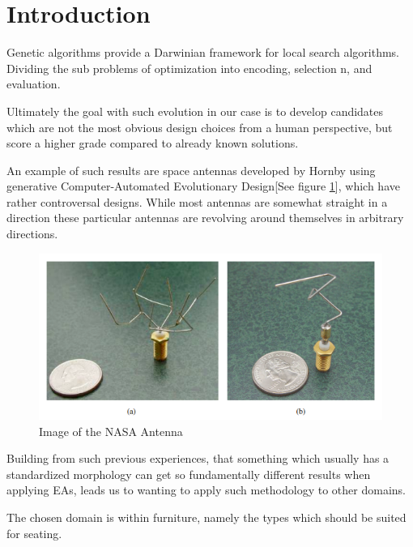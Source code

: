 \section{Introduction}
Genetic algorithms provide a Darwinian framework for local search algorithms.
Dividing the sub problems of optimization into encoding, selection
n, and evaluation\cite{paper:ev3}.

Ultimately the goal with such evolution in our case is to develop candidates
which are not the most obvious design choices from a human perspective, but
score a higher grade compared to already known solutions.

An example of such results are space antennas developed by
Hornby\cite{paper:ev4} using generative Computer-Automated Evolutionary
Design[See figure \ref{fig:nasa_antenna}], which have rather controversal
designs. While most antennas are somewhat straight in a direction these
particular antennas are revolving around themselves in arbitrary directions.

\begin{figure}[ht]
\includegraphics[scale=.7]{content/img/space_antenna}
\caption{Image of the NASA Antenna \cite{paper:ev4} }
\label{fig:nasa_antenna}
\end{figure}

Building from such previous experiences, that something which usually has a
standardized morphology can get so fundamentally different results when applying
EAs, leads us to wanting to apply such methodology to other domains.

The chosen domain is within furniture, namely the types which should be suited
for seating.

